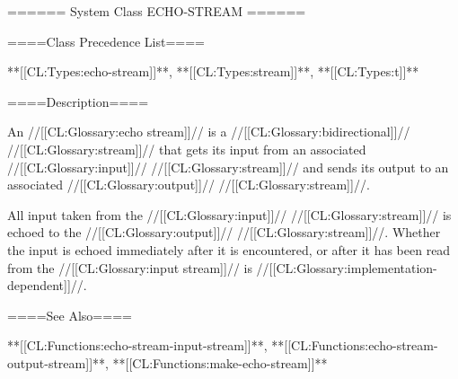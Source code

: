 ====== System Class ECHO-STREAM ======

====Class Precedence List====

**[[CL:Types:echo-stream]]**, **[[CL:Types:stream]]**, **[[CL:Types:t]]**

====Description====

An //[[CL:Glossary:echo stream]]// is a //[[CL:Glossary:bidirectional]]// //[[CL:Glossary:stream]]// that gets its input from an associated //[[CL:Glossary:input]]// //[[CL:Glossary:stream]]// and sends its output to an associated //[[CL:Glossary:output]]// //[[CL:Glossary:stream]]//.

All input taken from the //[[CL:Glossary:input]]// //[[CL:Glossary:stream]]// is echoed to the //[[CL:Glossary:output]]// //[[CL:Glossary:stream]]//. Whether the input is echoed immediately after it is encountered, or after it has been read from the //[[CL:Glossary:input stream]]// is //[[CL:Glossary:implementation-dependent]]//.

====See Also====

**[[CL:Functions:echo-stream-input-stream]]**, **[[CL:Functions:echo-stream-output-stream]]**, **[[CL:Functions:make-echo-stream]]**

 
